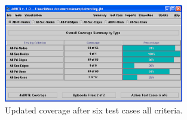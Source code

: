 \begin{figure}[!ht]
\begin{center}
\includegraphics[width=0.70\textwidth]{fig/report-by-criterion-tc6.eps}
\caption{\label{fig:summary-criterion-tc6} Updated coverage after
six test cases \wrt all criteria.}
\end{center}
\end{figure}

